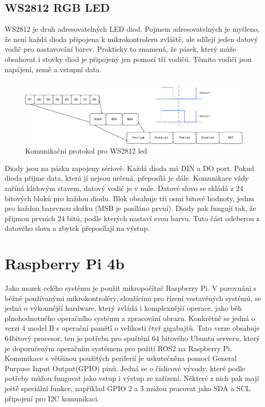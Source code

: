 \subsection*{WS2812 RGB LED}
WS2812 je druh adresovatelných LED diod. Pojmem adresovatelných je myšleno, že není každá dioda připojena k mikrokontroleru zvláště, ale sdílejí jeden datový vodič pro nastavování barev. Prakticky to znamená, že pásek, který může obsahovat i stovky diod je připojený jen pomocí tří vodičů. Těmito vodiči jsou napájení, země a vstupní data. \cite{ws2812}

\begin{figure}[h!]
	\centering
	\includegraphics[scale=0.55]{obrazky-figures/ws2812_led.pdf}
	\caption{Komunikační protokol pro WS2812 led}
	\label{}
\end{figure}

Diody jsou na pásku zapojeny sériově. Každá dioda má DIN a DO port. Pokud dioda přijme data, která jí nejsou určená, přeposílá je dále. Komunikace vždy začíná klidovým stavem, datový vodič je v nule. Datové slovo se skládá z 24 bitových bloků pro každou diodu. Blok obsahuje tři osmi bitové hodnoty, jednu pro každou barevnou složku (MSB je posíláno první). Diody pak fungují tak, že přijmou prvních 24 bitů, podle kterých nastaví svou barvu. Tuto část odeberou z datového slova a zbytek přeposílají na výstup. \cite{ws2812}

\section{Raspberry Pi 4b}
Jako mozek celého systému je použit mikropočítač Raspberry Pi. V porovnání s běžně používanými mikrokontroléry, sloužícími pro řízení vestavěných systémů, se jedná o výkonnější hardware, který zvládá i komplexnější operace, jako běh plnohodnotného operačního systému a zpracování obrazu. Konkrétně se jedná o verzi 4 model B s operační pamětí o velikosti čtyř gigabajtů. Tato verze obsahuje 64bitový procesor, ten je potřeba pro spuštění 64 bitového Ubuntu serveru, který je doporučeným operačním systémem pro požití ROS2 na Raspberry Pi.
Komunikace s většinou použitých periferií je uskutečněna pomocí General Purpuse Input Output(GPIO) pinů. Jedná se o číslicové vývody, které podle potřeby můžou fungovat jako vstup i výstup ze zařízení. Některé z nich pak mají ještě speciální funkce, například GPIO 2 a 3 můžou pracovat jako SDA a SCL připojení pro I2C komunikaci.


